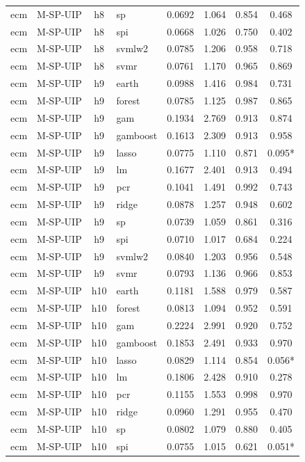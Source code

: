 \begin{ThreePartTable}
\begin{longtable}[t]{llclcccc}
ecm & M-SP-UIP & h8 & sp & 0.0692 & 1.064 & 0.854 & 0.468\\
ecm & M-SP-UIP & h8 & spi & 0.0668 & 1.026 & 0.750 & 0.402\\
ecm & M-SP-UIP & h8 & svmlw2 & 0.0785 & 1.206 & 0.958 & 0.718\\
ecm & M-SP-UIP & h8 & svmr & 0.0761 & 1.170 & 0.965 & 0.869\\
\addlinespace
ecm & M-SP-UIP & h9 & earth & 0.0988 & 1.416 & 0.984 & 0.731\\
ecm & M-SP-UIP & h9 & forest & 0.0785 & 1.125 & 0.987 & 0.865\\
ecm & M-SP-UIP & h9 & gam & 0.1934 & 2.769 & 0.913 & 0.874\\
ecm & M-SP-UIP & h9 & gamboost & 0.1613 & 2.309 & 0.913 & 0.958\\
ecm & M-SP-UIP & h9 & lasso & 0.0775 & 1.110 & 0.871 & 0.095*\\
ecm & M-SP-UIP & h9 & lm & 0.1677 & 2.401 & 0.913 & 0.494\\
ecm & M-SP-UIP & h9 & pcr & 0.1041 & 1.491 & 0.992 & 0.743\\
ecm & M-SP-UIP & h9 & ridge & 0.0878 & 1.257 & 0.948 & 0.602\\
ecm & M-SP-UIP & h9 & sp & 0.0739 & 1.059 & 0.861 & 0.316\\
ecm & M-SP-UIP & h9 & spi & 0.0710 & 1.017 & 0.684 & 0.224\\
ecm & M-SP-UIP & h9 & svmlw2 & 0.0840 & 1.203 & 0.956 & 0.548\\
ecm & M-SP-UIP & h9 & svmr & 0.0793 & 1.136 & 0.966 & 0.853\\
\addlinespace
ecm & M-SP-UIP & h10 & earth & 0.1181 & 1.588 & 0.979 & 0.587\\
ecm & M-SP-UIP & h10 & forest & 0.0813 & 1.094 & 0.952 & 0.591\\
ecm & M-SP-UIP & h10 & gam & 0.2224 & 2.991 & 0.920 & 0.752\\
ecm & M-SP-UIP & h10 & gamboost & 0.1853 & 2.491 & 0.933 & 0.970\\
ecm & M-SP-UIP & h10 & lasso & 0.0829 & 1.114 & 0.854 & 0.056*\\
ecm & M-SP-UIP & h10 & lm & 0.1806 & 2.428 & 0.910 & 0.278\\
ecm & M-SP-UIP & h10 & pcr & 0.1155 & 1.553 & 0.998 & 0.970\\
ecm & M-SP-UIP & h10 & ridge & 0.0960 & 1.291 & 0.955 & 0.470\\
ecm & M-SP-UIP & h10 & sp & 0.0802 & 1.079 & 0.880 & 0.405\\
ecm & M-SP-UIP & h10 & spi & 0.0755 & 1.015 & 0.621 & 0.051*\\

\end{longtable}
\end{ThreePartTable}
